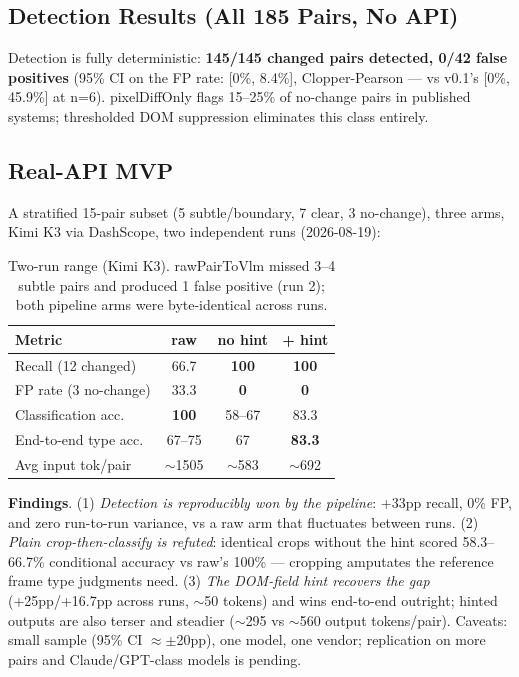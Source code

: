 \documentclass[10pt,twocolumn,letterpaper]{article}
\begin{document}
\subsection{Detection Results (All 185 Pairs, No API)}

Detection is fully deterministic: \textbf{145/145 changed pairs detected, 0/42 false positives} (95\% CI on the FP rate: [0\%, 8.4\%], Clopper-Pearson — vs v0.1's [0\%, 45.9\%] at n=6). pixelDiffOnly flags 15--25\% of no-change pairs in published systems; thresholded DOM suppression eliminates this class entirely.

\subsection{Real-API MVP\label{sec:mvp}}

A stratified 15-pair subset (5 subtle/boundary, 7 clear, 3 no-change), three arms, Kimi K3 via DashScope, two independent runs (2026-08-19):

\begin{table}[h]
\centering
\small
\begin{tabular}{lccc}
\toprule
\textbf{Metric} & \textbf{raw} & \textbf{no hint} & \textbf{+ hint} \\
\midrule
Recall (12 changed) & 66.7 & \textbf{100} & \textbf{100} \\
FP rate (3 no-change) & 33.3 & \textbf{0} & \textbf{0} \\
Classification acc. & \textbf{100} & 58--67 & 83.3 \\
End-to-end type acc. & 67--75 & 67 & \textbf{83.3} \\
Avg input tok/pair & $\sim$1505 & $\sim$583 & $\sim$692 \\
\bottomrule
\end{tabular}
\caption{Two-run range (Kimi K3). rawPairToVlm missed 3--4 subtle pairs and produced 1 false positive (run 2); both pipeline arms were byte-identical across runs.}
\label{tab:mvp}
\end{table}

\textbf{Findings}. (1) \textit{Detection is reproducibly won by the pipeline}: +33pp recall, 0\% FP, and zero run-to-run variance, vs a raw arm that fluctuates between runs. (2) \textit{Plain crop-then-classify is refuted}: identical crops without the hint scored 58.3--66.7\% conditional accuracy vs raw's 100\% — cropping amputates the reference frame type judgments need. (3) \textit{The DOM-field hint recovers the gap} (+25pp/+16.7pp across runs, $\sim$50 tokens) and wins end-to-end outright; hinted outputs are also terser and steadier ($\sim$295 vs $\sim$560 output tokens/pair). Caveats: small sample (95\% CI $\approx\pm$20pp), one model, one vendor; replication on more pairs and Claude/GPT-class models is pending.
\end{document}
